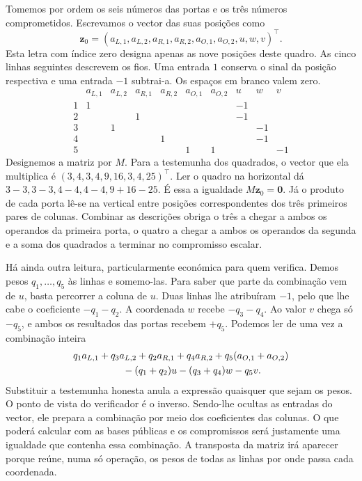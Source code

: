 Tomemos por ordem os seis números das portas e os três números
comprometidos. Escrevamos o vector das suas posições como
\[
 \boldsymbol z_0=(a_{L,1},a_{L,2},a_{R,1},a_{R,2},
                      a_{O,1},a_{O,2},u,w,v)^\top .
\]
Esta letra com índice zero designa apenas as nove posições deste
quadro. As cinco linhas seguintes descrevem os fios. Uma entrada
\(1\) conserva o sinal da posição respectiva e uma entrada
\(-1\) subtrai-a. Os espaços em branco valem zero.
\[
\begin{array}{c|rr|rr|rr|rr|r}
 &a_{L,1}&a_{L,2}&a_{R,1}&a_{R,2}&a_{O,1}&a_{O,2}&u&w&v\\ \hline
 1&1&&&&&&-1&&\\
 2&&&1&&&&-1&&\\
 3&&1&&&&&&-1&\\
 4&&&&1&&&&-1&\\
 5&&&&&1&1&&&-1
\end{array}
\]
Designemos a matriz por \(M\). Para a testemunha dos quadrados,
o vector que ela multiplica é \((3,4,3,4,9,16,3,4,25)^\top\).
Ler o quadro na horizontal dá \(3-3,3-3,4-4,4-4,9+16-25\).
É essa a igualdade \(M\boldsymbol z_0=\boldsymbol0\). Já o
produto de cada porta lê-se na vertical entre posições
correspondentes dos três primeiros pares de colunas. Combinar as
descrições obriga o três a chegar a ambos os operandos da primeira
porta, o quatro a chegar a ambos os operandos da segunda e a soma
dos quadrados a terminar no compromisso escalar.

Há ainda outra leitura, particularmente económica para quem
verifica. Demos pesos \(q_1,\ldots,q_5\) às linhas e somemo-las.
Para saber que parte da combinação vem de \(u\), basta percorrer a
coluna de \(u\). Duas linhas lhe atribuíram \(-1\), pelo que lhe cabe o coeficiente \(-q_1-q_2\). A coordenada \(w\) recebe
\(-q_3-q_4\). Ao valor \(v\) chega só \(-q_5\), e ambos os
resultados das portas recebem \(+q_5\). Podemos ler de uma vez
a combinação inteira
\[
 \begin{aligned}
 &q_1a_{L,1}+q_3a_{L,2}
     +q_2a_{R,1}+q_4a_{R,2}
     +q_5(a_{O,1}+a_{O,2})\\
 &\hspace{18mm}-(q_1+q_2)u-(q_3+q_4)w-q_5v .
 \end{aligned}
\]
Substituir a testemunha honesta anula a expressão quaisquer que
sejam os pesos. O ponto de vista do verificador é o inverso.
Sendo-lhe ocultas as entradas do vector, ele prepara a combinação
por meio dos coeficientes das colunas. O que poderá calcular com
as bases públicas e os compromissos será justamente uma igualdade
que contenha essa combinação. A transposta da matriz irá aparecer
porque reúne, numa só operação, os pesos de todas as linhas por onde
passa cada coordenada.

